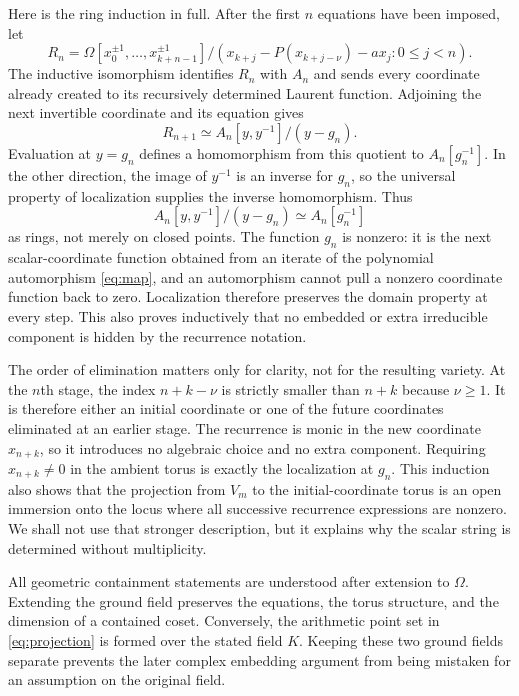 \documentclass[11pt]{article}
\theoremstyle{definition}
\theoremstyle{remark}
\newcommand{\Om}{\Omega}
\begin{document}
Here is the ring induction in full.  After the first $n$ equations have
been imposed, let
\[
R_n=\Om[x_0^{\pm1},\ldots,x_{k+n-1}^{\pm1}]
 /(x_{k+j}-P(x_{k+j-\nu})-a x_j:0\leq j<n).
\]
The inductive isomorphism identifies $R_n$ with $A_n$ and sends every
coordinate already created to its recursively determined Laurent function.
Adjoining the next invertible coordinate and its equation gives
\[
 R_{n+1}\simeq
 A_n[y,y^{-1}]/(y-g_n).
\]
Evaluation at $y=g_n$ defines a homomorphism from this quotient to
$A_n[g_n^{-1}]$.  In the other direction, the image of $y^{-1}$ is an
inverse for $g_n$, so the universal property of localization supplies the
inverse homomorphism.  Thus
\[
A_n[y,y^{-1}]/(y-g_n)\simeq A_n[g_n^{-1}]
\]
as rings, not merely on closed points.  The function $g_n$ is nonzero: it
is the next scalar-coordinate function obtained from an iterate of the
polynomial automorphism \eqref{eq:map}, and an automorphism cannot pull a
nonzero coordinate function back to zero.  Localization therefore preserves
the domain property at every step.  This also proves inductively that no
embedded or extra irreducible component is hidden by the recurrence
notation.

The order of elimination matters only for clarity, not for the resulting
variety.  At the $n$th stage, the index $n+k-\nu$ is strictly smaller than
$n+k$ because $\nu\geq1$.  It is therefore either an initial coordinate or
one of the future coordinates eliminated at an earlier stage.  The
recurrence is monic in the new coordinate $x_{n+k}$, so it introduces no
algebraic choice and no extra component.  Requiring $x_{n+k}\neq0$ in the
ambient torus is exactly the localization at $g_n$.  This induction also
shows that the projection from $V_m$ to the initial-coordinate torus is an
open immersion onto the locus where all successive recurrence expressions
are nonzero.  We shall not use that stronger description, but it explains
why the scalar string is determined without multiplicity.

All geometric containment statements are understood after extension to
$\Om$.  Extending the ground field preserves the equations, the torus
structure, and the dimension of a contained coset.  Conversely, the
arithmetic point set in \eqref{eq:projection} is formed over the stated field
$K$.  Keeping these two ground fields separate prevents the later complex
embedding argument from being mistaken for an assumption on the original
field.
\end{document}
